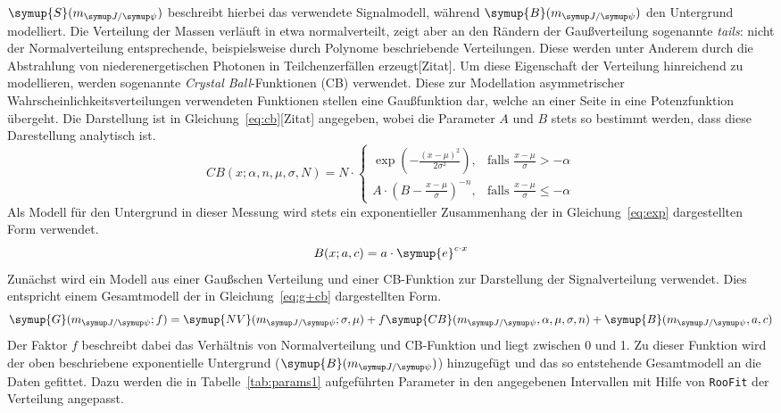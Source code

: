%
$\symup{S}(m_{\jpsi})$ beschreibt hierbei das verwendete Signalmodell, während $\symup{B}(m_{\jpsi})$ den Untergrund modelliert. Die Verteilung der Massen verläuft in etwa normalverteilt, zeigt aber an den Rändern der Gaußverteilung sogenannte \textit{tails}: nicht der Normalverteilung entsprechende, beispielsweise durch Polynome beschriebende Verteilungen. Diese werden unter Anderem durch die Abstrahlung von niederenergetischen Photonen in Teilchenzerfällen erzeugt[Zitat]. Um diese Eigenschaft der Verteilung hinreichend zu modellieren, werden sogenannte \textit{Crystal Ball}-Funktionen (CB) verwendet. Diese zur Modellation asymmetrischer Wahrscheinlichkeitsverteilungen verwendeten Funktionen stellen eine Gaußfunktion dar, welche an einer Seite in eine Potenzfunktion übergeht. Die Darstellung ist in Gleichung~\ref{eq:cb}[Zitat] angegeben, wobei die Parameter $A$ und $B$ stets so bestimmt werden, dass diese Darestellung analytisch ist.
%
\begin{equation}
  {\displaystyle CB(x;\alpha ,n,{\mu},\sigma,N)=N\cdot {\begin{cases}\exp \left(-{\frac {(x-{\mu})^{2}}{2\sigma ^{2}}}\right),&{\mbox{falls }}{\frac {x-{\mu}}{\sigma }}>-\alpha \\A\cdot \left(B-{\frac {x-{\mu}}{\sigma }}\right)^{-n},&{\mbox{falls }}{\frac {x-{\mu}}{\sigma }}\leqslant -\alpha \end{cases}}}
  \label{eq:cb}
\end{equation}
%
Als Modell für den Untergrund in dieser Messung wird stets ein exponentieller Zusammenhang der in Gleichung~\ref{eq:exp} dargestellten Form verwendet.
%
\begin{equation}
  B(x;a,c)=a\cdot \symup{e}^{c\cdot x}
  \label{eq:exp}
\end{equation}
%
Zunächst wird ein Modell aus einer Gaußschen Verteilung und einer CB-Funktion zur Darstellung der Signalverteilung verwendet. Dies entspricht einem Gesamtmodell der in Gleichung~\ref{eq:g+cb} dargestellten Form.
%
\begin{equation}
  \symup{G}(m_{\jpsi}; f)= \symup{NV}(m_{\jpsi};\sigma,\mu) + f\symup{CB}(m_{\jpsi},\alpha,\mu,\sigma,n) + \symup{B}(m_{\jpsi},a,c)
  \label{eq:g+cb}
\end{equation}
%
Der Faktor $f$ beschreibt dabei das Verhältnis von Normalverteilung und CB-Funktion und liegt zwischen 0 und 1. Zu dieser Funktion wird der oben beschriebene exponentielle Untergrund ($\symup{B}(m_{\jpsi})$) hinzugefügt und das so entstehende Gesamtmodell an die Daten gefittet. Dazu werden die in Tabelle~\ref{tab:params1} aufgeführten Parameter in den angegebenen Intervallen mit Hilfe von \texttt{RooFit} der Verteilung angepasst.
